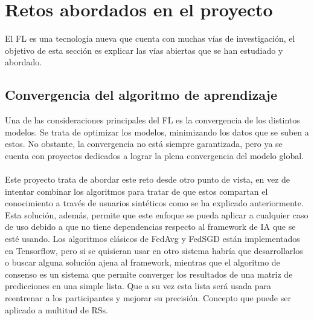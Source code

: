 \section{Retos abordados en el proyecto}
El FL es una tecnología nueva que cuenta con muchas vías de investigación, el objetivo de esta sección es explicar las vías abiertas que se han estudiado y abordado. 
\subsection{Convergencia del algoritmo de aprendizaje}
Una de las consideraciones principales del FL es la convergencia de los distintos modelos. Se trata de optimizar los modelos, minimizando los datos que se suben a estos. No obstante, la convergencia no está siempre garantizada, pero ya se cuenta con proyectos dedicados a lograr la plena convergencia del modelo global.
\\ \\
Este proyecto trata de abordar este reto desde otro punto de vista, en vez de intentar combinar los algoritmos para tratar de que estos compartan el conocimiento a través de usuarios sintéticos como se ha explicado anteriormente. Esta solución, además, permite que este enfoque se pueda aplicar a cualquier caso de uso debido a que no tiene dependencias respecto al framework de IA que se esté usando. Los algoritmos clásicos de FedAvg y FedSGD están implementados en Tensorflow, pero si se quisieran usar en otro sistema habría que desarrollarlos o buscar alguna solución ajena al framework, mientras que el algoritmo de consenso es un sistema que permite converger los resultados de una matriz de predicciones en una simple lista. Que a su vez esta lista será usada para reentrenar a los participantes y mejorar su precisión. Concepto que puede ser aplicado a multitud de RSs.


